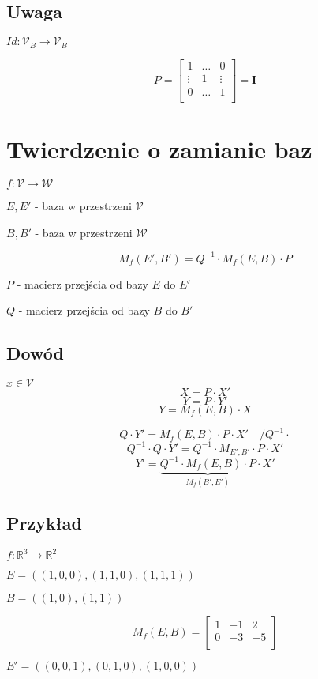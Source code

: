 \documentclass[11pt]{article}
\begin{document}
\subsection{Uwaga}
$Id : \mathcal{V}_B\to \mathcal{V}_B$

$$ P = \begin{bmatrix}
	1 & \ldots & 0\\
	\vdots & 1 & \vdots\\
	0 & \ldots & 1\\
\end{bmatrix} = \mathbf{I}$$

\section{Twierdzenie o zamianie baz}
$ f : \mathcal{V} \to \mathcal{W} $

$ E,E' $ - baza w przestrzeni $\mathcal{V}$ 

$ B,B' $ - baza w przestrzeni $\mathcal{W}$

$$ M_f(E',B') = Q^{-1} \cdot M_f(E,B) \cdot P $$

$P$ - macierz przejścia od bazy $E$ do $E'$

$Q$ - macierz przejścia od bazy $B$ do $B'$

\subsection{Dowód}
$ x \in \mathcal{V} $
$$ X = P \cdot X' $$
$$ Y = P \cdot Y' $$
$$ Y = M_f(E,B) \cdot X $$

$$ Q \cdot Y' = M_f(E,B) \cdot P \cdot X' \quad / Q^{-1} \cdot $$
$$ Q^{-1} \cdot Q \cdot Y' = Q^{-1} \cdot M_{E',B'} \cdot P \cdot X'$$
$$ Y'  =  \underbrace{Q^{-1} \cdot M_f(E,B) \cdot P}_{M_f(B',E')} \cdot X'$$

\subsection{Przykład}
$ f : \mathbb{R}^3 \to \mathbb{R}^2 $

$ E = ((1,0,0),(1,1,0),(1,1,1)) $

$ B = ((1,0),(1,1)) $

$$ M_f(E,B) = \begin{bmatrix}
	1 & -1 & 2\\
	0 & -3 & -5\\
\end{bmatrix}$$

$ E' = ( (0,0,1) , (0,1,0), (1,0,0) ) $
\end{document}
